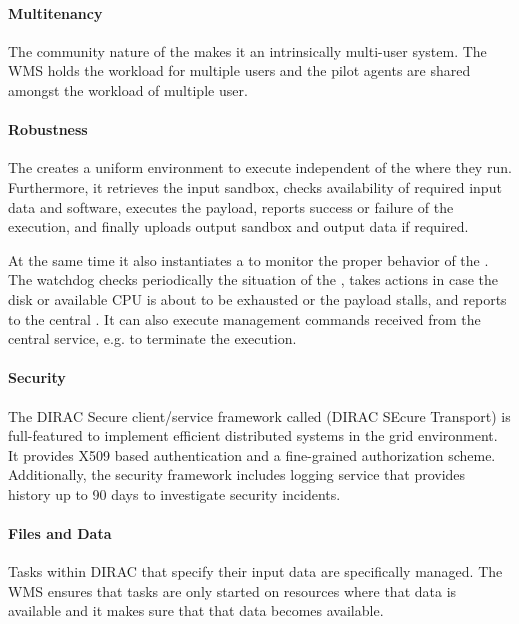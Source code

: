 \documentclass{sig-alternate}
\begin{document}
\paragraph{Multitenancy}

The community nature of the  makes it an intrinsically
multi-user system. The WMS holds the workload for multiple users and the pilot
agents are shared amongst the workload of multiple user.

\paragraph{Robustness}

The  creates a uniform environment to execute
 independent of the  where they run.
Furthermore, it retrieves the input sandbox, checks availability of required
input data and software, executes the payload, reports success or failure of
the execution, and finally uploads output sandbox and output data if required.

At the same time it also instantiates a  to monitor the
proper behavior of the . The watchdog checks periodically
the situation of the , takes actions in case the disk or
available CPU is about to be exhausted or the payload stalls, and reports to
the central . It can also execute management commands received
from the central service, e.g. to terminate the  execution.

\paragraph{Security}

The DIRAC Secure client/service framework called  (DIRAC SEcure
Transport) is full-featured to implement efficient distributed systems in the
grid environment\cite{}. It provides X509 based authentication and a
fine-grained authorization scheme. Additionally, the security framework
includes logging service that provides history up to 90 days to investigate
security incidents.

\paragraph{Files and Data}

Tasks within DIRAC that specify their input data are specifically managed. The
WMS ensures that tasks are only started on resources where that data is
available and it makes sure that that data becomes available.
\end{document}
